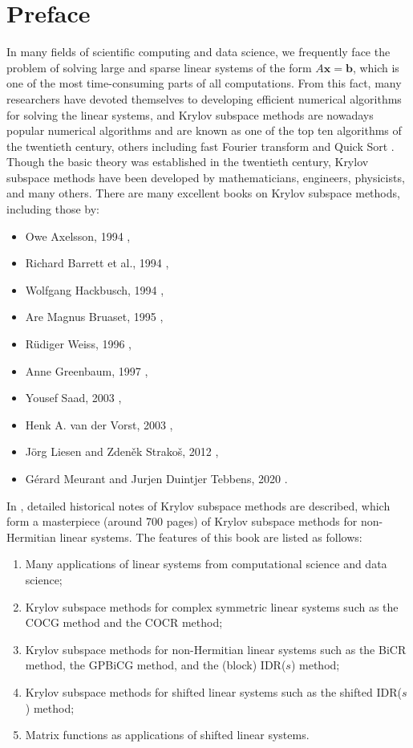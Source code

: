 \section*{{Preface}}\label{sec:preface}
{In many fields of scientific computing and data science, we frequently face the problem of solving large and sparse linear systems of the form $A\bm x=\bm b$, which is one of the most time-consuming parts of all computations. From this fact, many researchers have devoted themselves to developing efficient numerical algorithms for solving the linear systems, and Krylov subspace methods are nowadays popular numerical algorithms and are known as one of the top ten algorithms of the twentieth century, others including fast Fourier transform and Quick Sort . Though the basic theory was established in the twentieth century, Krylov subspace methods have been developed by mathematicians, engineers, physicists, and many others.}
{There are many excellent books on Krylov subspace methods, including those by:}
\begin{itemize}
\item Owe Axelsson, 1994 ,
\item Richard Barrett et al., 1994 ,
\item Wolfgang Hackbusch, 1994 ,
\item Are Magnus Bruaset, 1995 ,
\item Rüdiger Weiss, 1996 ,
\item Anne Greenbaum, 1997 ,
\item Yousef Saad, 2003 ,
\item Henk A. van der Vorst, 2003 ,
\item Jörg Liesen {and} Zdeněk Strakoš, 2012 ,
\item Gérard Meurant {and} Jurjen Duintjer Tebbens, 2020 .
\end{itemize}
{In , detailed historical notes of Krylov subspace methods are described, which form a masterpiece (around 700 pages) of Krylov subspace methods for non-Hermitian linear systems. The features of this book are listed as follows:}
\begin{enumerate}[label=(\arabic*)]
\item {Many applications of linear systems from computational science and data science;}
\item {Krylov subspace methods for complex symmetric linear systems such as the COCG method and the COCR method;}
\item {Krylov subspace methods for non-Hermitian linear systems such as the BiCR method, the GPBiCG method, and the (block) IDR($s$) method;}
\item {Krylov subspace methods for shifted linear systems such as the shifted IDR($s$) method;}
\item {Matrix functions as applications of shifted linear systems.}
\end{enumerate}
